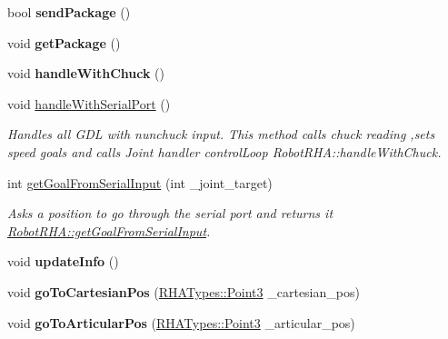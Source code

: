 \begin{DoxyCompactItemize}
\item 
bool {\bfseries send\+Package} ()\hypertarget{classRobotRHA_a9e89942ddeaf4e908cd72a361d72bb0b}{}\label{classRobotRHA_a9e89942ddeaf4e908cd72a361d72bb0b}

\item 
void {\bfseries get\+Package} ()\hypertarget{classRobotRHA_a2a8f61cb25417b00e550c6844b519df3}{}\label{classRobotRHA_a2a8f61cb25417b00e550c6844b519df3}

\item 
void {\bfseries handle\+With\+Chuck} ()\hypertarget{classRobotRHA_a6d3753aac9b06ba092d0704d2f32f0ea}{}\label{classRobotRHA_a6d3753aac9b06ba092d0704d2f32f0ea}

\item 
void \hyperlink{classRobotRHA_a1c068efc59b023a324fadb569d239553}{handle\+With\+Serial\+Port} ()
\begin{DoxyCompactList}\small\item\em Handles all G\+DL with nunchuck input. This method calls chuck reading ,sets speed goals and calls Joint handler control\+Loop  Robot\+R\+H\+A\+::handle\+With\+Chuck. \end{DoxyCompactList}\item 
int \hyperlink{classRobotRHA_a6d60a84fb87ab47ba5987f8ec62ab617}{get\+Goal\+From\+Serial\+Input} (int \+\_\+joint\+\_\+target)
\begin{DoxyCompactList}\small\item\em Asks a position to go through the serial port and returns it  \hyperlink{classRobotRHA_a6d60a84fb87ab47ba5987f8ec62ab617}{Robot\+R\+H\+A\+::get\+Goal\+From\+Serial\+Input}. \end{DoxyCompactList}\item 
void {\bfseries update\+Info} ()\hypertarget{classRobotRHA_a2a877fd929caf3cdd423d3fd22c4bffa}{}\label{classRobotRHA_a2a877fd929caf3cdd423d3fd22c4bffa}

\item 
void {\bfseries go\+To\+Cartesian\+Pos} (\hyperlink{structRHATypes_1_1Point3}{R\+H\+A\+Types\+::\+Point3} \+\_\+cartesian\+\_\+pos)\hypertarget{classRobotRHA_a8f5818156ec8933c62b761b53b043dd0}{}\label{classRobotRHA_a8f5818156ec8933c62b761b53b043dd0}

\item 
void {\bfseries go\+To\+Articular\+Pos} (\hyperlink{structRHATypes_1_1Point3}{R\+H\+A\+Types\+::\+Point3} \+\_\+articular\+\_\+pos)\hypertarget{classRobotRHA_a20edddf9008c1dd17fa3646e5ebdfc41}{}\label{classRobotRHA_a20edddf9008c1dd17fa3646e5ebdfc41}


\end{DoxyCompactItemize}
